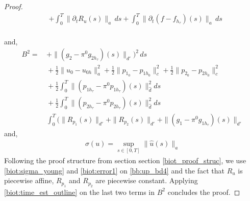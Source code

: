 \begin{proof}
\begin{align*}
& + \int_0^{T} \| \partial_t R_u (s)\|_a \, ds  + \int_0^{T} \| \partial_t (f - f_{h_\tau})(s)\|_a \, ds 
\end{align*}
\\
and,
\begin{align*}
B^2 = 
& \, + \|(g_2-\pi^0g_{2h_\tau})(s)\|_{d'}\bigr)^2\, ds \\
& \, + \tfrac{1}{2}\|u_0 - u_{0 h} \|^2_a + \tfrac{1}{2}\|p_{1_0} - p_{1h_0} \|^2_c + \tfrac{1}{2}\|p_{2_0} - p_{2h_0} \|^2_c \\
& \, + \tfrac{1}{2} \int_0^{T} \|(p_{1h_\tau}-\pi^0p_{1h_\tau})(s)\|_{\hat{d}}^2 ds \\
& \, + \tfrac{1}{2} \int_0^{T} \|(p_{2h_\tau}-\pi^0p_{2h_\tau})(s)\|_{\hat{d}}^2 ds \\
& \, \int_0^{T} \bigl( \| R_{p_1}(s)\|_{d'}  + \| R_{p_2}(s)\|_{d'} + \|(g_1-\pi^0g_{1h_\tau})(s)\|_{d'} 
\end{align*}
and,
\begin{align*}
\sigma(u) = \sup_{s \in [0,T]} \| \hat{u}(s)\|_a
\end{align*}
Following the proof structure from section section \ref{biot_proof_struc}, we use \eqref{biot:sigma_young} and \eqref{biot:error1} on \eqref{bb:up_bd4} and the fact that $R_u$ is piecewise affine, $R_{p_1}$ and $R_{p_2}$ are piecewise constant. Applying 
\eqref{biot:time_est_outline} on the last two terms in $B^2$ concludes the proof.  
\end{proof}

